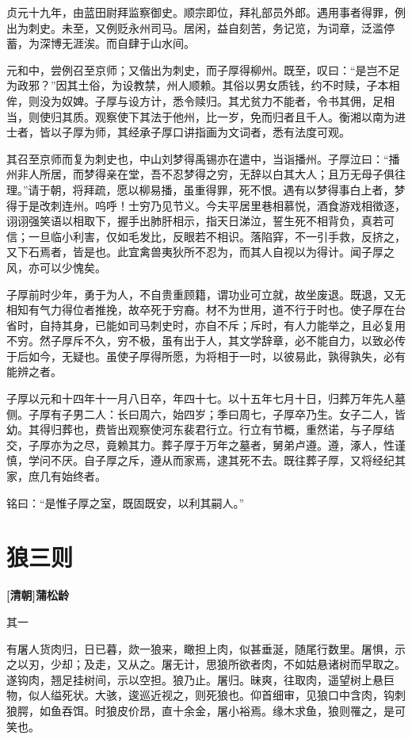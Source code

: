 \documentclass[UTF8,titlepage,oneside]{ctexbook}
\begin{document}
贞元十九年，由蓝田尉拜监察御史。顺宗即位，拜礼部员外郎。遇用事者得罪，例出为刺史。未至，又例贬永州司马。居闲，益自刻苦，务记览，为词章，泛滥停蓄，为深博无涯涘。而自肆于山水间。

元和中，尝例召至京师；又偕出为刺史，而子厚得柳州。既至，叹曰：“是岂不足为政邪？”因其土俗，为设教禁，州人顺赖。其俗以男女质钱，约不时赎，子本相侔，则没为奴婢。子厚与设方计，悉令赎归。其尤贫力不能者，令书其佣，足相当，则使归其质。观察使下其法于他州，比一岁，免而归者且千人。衡湘以南为进士者，皆以子厚为师，其经承子厚口讲指画为文词者，悉有法度可观。

其召至京师而复为刺史也，中山刘梦得禹锡亦在遣中，当诣播州。子厚泣曰：“播州非人所居，而梦得亲在堂，吾不忍梦得之穷，无辞以白其大人；且万无母子俱往理。”请于朝，将拜疏，愿以柳易播，虽重得罪，死不恨。遇有以梦得事白上者，梦得于是改刺连州。呜呼！士穷乃见节义。今夫平居里巷相慕悦，酒食游戏相徵逐，诩诩强笑语以相取下，握手出肺肝相示，指天日涕泣，誓生死不相背负，真若可信；一旦临小利害，仅如毛发比，反眼若不相识。落陷穽，不一引手救，反挤之，又下石焉者，皆是也。此宜禽兽夷狄所不忍为，而其人自视以为得计。闻子厚之风，亦可以少愧矣。

子厚前时少年，勇于为人，不自贵重顾籍，谓功业可立就，故坐废退。既退，又无相知有气力得位者推挽，故卒死于穷裔。材不为世用，道不行于时也。使子厚在台省时，自持其身，已能如司马刺史时，亦自不斥；斥时，有人力能举之，且必复用不穷。然子厚斥不久，穷不极，虽有出于人，其文学辞章，必不能自力，以致必传于后如今，无疑也。虽使子厚得所愿，为将相于一时，以彼易此，孰得孰失，必有能辨之者。

子厚以元和十四年十一月八日卒，年四十七。以十五年七月十日，归葬万年先人墓侧。子厚有子男二人：长曰周六，始四岁；季曰周七，子厚卒乃生。女子二人，皆幼。其得归葬也，费皆出观察使河东裴君行立。行立有节概，重然诺，与子厚结交，子厚亦为之尽，竟赖其力。葬子厚于万年之墓者，舅弟卢遵。遵，涿人，性谨慎，学问不厌。自子厚之斥，遵从而家焉，逮其死不去。既往葬子厚，又将经纪其家，庶几有始终者。

铭曰：“是惟子厚之室，既固既安，以利其嗣人。”


\chapter*{狼三则}
\begin{center}
	\textbf{[清朝]蒲松龄}
\end{center}


其一

有屠人货肉归，日已暮，欻一狼来，瞰担上肉，似甚垂涎，随尾行数里。屠惧，示之以刃，少却；及走，又从之。屠无计，思狼所欲者肉，不如姑悬诸树而早取之。遂钩肉，翘足挂树间，示以空担。狼乃止。屠归。昧爽，往取肉，遥望树上悬巨物，似人缢死状。大骇，逡巡近视之，则死狼也。仰首细审，见狼口中含肉，钩刺狼腭，如鱼吞饵。时狼皮价昂，直十余金，屠小裕焉。缘木求鱼，狼则罹之，是可笑也。
\end{document}
